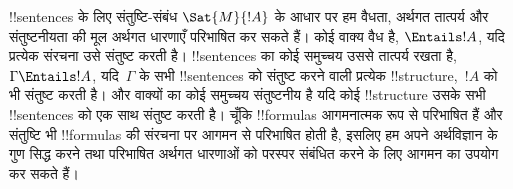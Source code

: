 \documentclass[../../../include/open-logic-section]{subfiles}
\begin{document}
!!{sentence}s के लिए संतुष्टि-संबंध $\Sat{M}{!A}$ के आधार पर हम वैधता,
अर्थगत तात्पर्य और संतुष्टनीयता की मूल अर्थगत धारणाएँ परिभाषित कर सकते हैं।
कोई वाक्य वैध है, $\Entails !A$, यदि प्रत्येक संरचना उसे संतुष्ट करती है।
!!{sentence}s का कोई समुच्चय उससे तात्पर्य रखता है, $\Gamma \Entails !A$,
यदि~$\Gamma$ के सभी !!{sentence}s को संतुष्ट करने वाली प्रत्येक
!!{structure},~$!A$ को भी संतुष्ट करती है। और वाक्यों का कोई समुच्चय
संतुष्टनीय है यदि कोई !!{structure} उसके सभी !!{sentence}s को एक साथ संतुष्ट
करती है। चूँकि !!{formula}s आगमनात्मक रूप से परिभाषित हैं और संतुष्टि भी
!!{formula}s की संरचना पर आगमन से परिभाषित होती है, इसलिए हम अपने अर्थविज्ञान
के गुण सिद्ध करने तथा परिभाषित अर्थगत धारणाओं को परस्पर संबंधित करने के लिए
आगमन का उपयोग कर सकते हैं।
\end{document}
